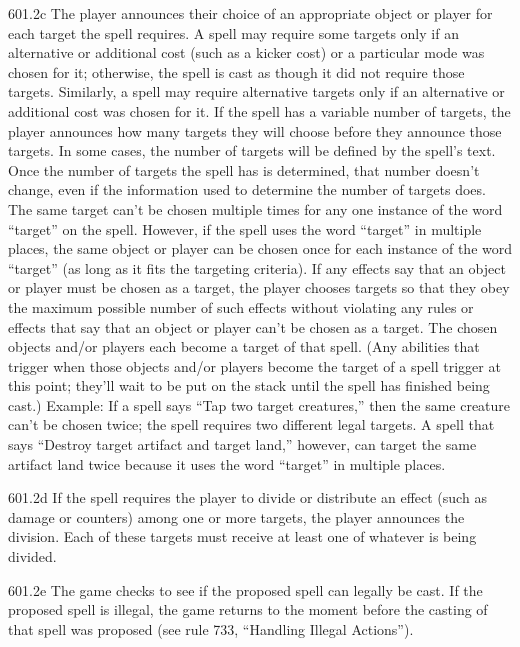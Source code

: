 601.2c The player announces their choice of an appropriate object or player for each target the spell requires. A spell may require some targets only if an alternative or additional cost (such as a kicker cost) or a particular mode was chosen for it; otherwise, the spell is cast as though it did not require those targets. Similarly, a spell may require alternative targets only if an alternative or additional cost was chosen for it. If the spell has a variable number of targets, the player announces how many targets they will choose before they announce those targets. In some cases, the number of targets will be defined by the spell’s text. Once the number of targets the spell has is determined, that number doesn’t change, even if the information used to determine the number of targets does. The same target can’t be chosen multiple times for any one instance of the word “target” on the spell. However, if the spell uses the word “target” in multiple places, the same object or player can be chosen once for each instance of the word “target” (as long as it fits the targeting criteria). If any effects say that an object or player must be chosen as a target, the player chooses targets so that they obey the maximum possible number of such effects without violating any rules or effects that say that an object or player can’t be chosen as a target. The chosen objects and/or players each become a target of that spell. (Any abilities that trigger when those objects and/or players become the target of a spell trigger at this point; they’ll wait to be put on the stack until the spell has finished being cast.)
Example: If a spell says “Tap two target creatures,” then the same creature can’t be chosen twice; the spell requires two different legal targets. A spell that says “Destroy target artifact and target land,” however, can target the same artifact land twice because it uses the word “target” in multiple places.

601.2d If the spell requires the player to divide or distribute an effect (such as damage or counters) among one or more targets, the player announces the division. Each of these targets must receive at least one of whatever is being divided.

601.2e The game checks to see if the proposed spell can legally be cast. If the proposed spell is illegal, the game returns to the moment before the casting of that spell was proposed (see rule 733, “Handling Illegal Actions”).

